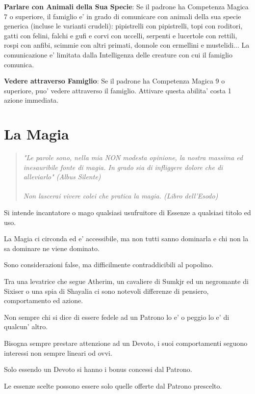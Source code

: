 \documentclass[a4paper,11pt,twoside,openany]{book}
\begin{document}
\textbf{Parlare con Animali della Sua Specie}: Se il padrone ha Competenza Magica 7 o superiore, il famiglio e' in grado di comunicare con animali della sua specie generica (incluse le varianti crudeli): pipistrelli con pipistrelli, topi con roditori, gatti con felini, falchi e gufi e corvi con uccelli, serpenti e lucertole con rettili, rospi con anfibi, scimmie con altri primati, donnole con ermellini e mustelidi... La comunicazione e' limitata dalla Intelligenza delle creature con cui il famiglio comunica.

\textbf{Vedere attraverso Famiglio}: Se il padrone ha Competenza Magica 9 o superiore, puo' vedere attraverso il famiglio. Attivare questa abilita' costa 1 azione immediata.

\pagebreak

\section{La Magia}

\label{la-magia}
\begin{quote}\textit{
"Le parole sono, nella mia NON modesta opinione, la nostra massima ed inesauribile fonte di magia. In grado sia di infliggere dolore che di alleviarlo" (Albus Silente)\\\\
Non lascerai vivere colei che pratica la magia. (Libro dell'Esodo)
}\end{quote}

Si intende incantatore o mago qualsiasi usufruitore di Essenze a qualsiasi titolo ed uso.

La Magia ci circonda ed e' accessibile, ma non tutti sanno dominarla e chi non la sa dominare ne viene dominato.

Sono considerazioni false, ma difficilmente contraddicibili al popolino.

Tra una levatrice che segue Atherim, un cavaliere di Sumkjr ed un negromante di Sixiser o una spia di Shayalia ci sono notevoli differenze di pensiero, comportamento ed azione.

Non sempre chi si dice di essere fedele ad un Patrono lo e' o peggio lo e' di qualcun' altro.

Bisogna sempre prestare attenzione ad un Devoto, i suoi comportamenti seguono interessi non sempre lineari od ovvi.

Solo essendo un Devoto si hanno i bonus concessi dal Patrono. 

Le essenze scelte possono essere solo quelle offerte dal Patrono prescelto.
\end{document}
